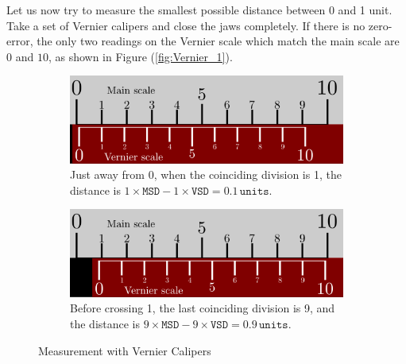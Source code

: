 Let us now try to measure the smallest possible distance between 0 and 1 unit. Take a set of Vernier calipers and close the jaws completely. If there is no zero-error, the only two readings on the Vernier scale which match the main scale are $0$ and $10$, as shown in Figure (\ref{fig:Vernier_1}).

\begin{figure}[!htb]
        \begin{subfigure}[b]{0.5\textwidth}
                \includegraphics[width=0.95\linewidth]{figs/Vernier2.png}
                \caption{Just away from 0, when the coinciding division is 1, the distance is $1\times\texttt{MSD}-1\times\texttt{VSD}=0.1\, \texttt{units}$.}
                \label{fig:Vernier_2}
        \end{subfigure}\hfill
        \begin{subfigure}[b]{0.5\textwidth}
                \includegraphics[width=0.95\linewidth]{figs/Vernier3.png}
                \caption{Before crossing 1, the last coinciding division is 9, and the distance is $9\times\texttt{MSD}-9\times\texttt{VSD}=0.9\, \texttt{units}$.}
                \label{fig:Vernier_3}
        \end{subfigure}%
        \caption{Measurement with Vernier Calipers}
        \label{fig:Verniermeasurements}
\end{figure}

